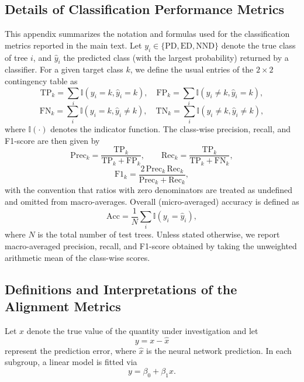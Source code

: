 {\clearpage
\subsection{Details of Classification Performance Metrics}
\label{appendix::classification-performance}
This appendix summarizes the notation and formulas used for the classification metrics reported in the main text. Let \(y_i \in \{\mathrm{PD},\mathrm{ED},\mathrm{NND}\}\) denote the true class of tree \(i\), and \(\widehat{y}_i\) the predicted class (with the largest probability) returned by a classifier. For a given target class \(k\), we define the usual entries of the \(2\times 2\) contingency table as
\begin{equation}
\mathrm{TP}_k = \sum_i \mathbb{I}(y_i = k, \widehat{y}_i = k), \quad
\mathrm{FP}_k = \sum_i \mathbb{I}(y_i \neq k, \widehat{y}_i = k),
\end{equation}
\begin{equation}
\mathrm{FN}_k = \sum_i \mathbb{I}(y_i = k, \widehat{y}_i \neq k), \quad
\mathrm{TN}_k = \sum_i \mathbb{I}(y_i \neq k, \widehat{y}_i \neq k),
\end{equation}
where \(\mathbb{I}(\cdot)\) denotes the indicator function. The class-wise precision, recall, and F1-score are then given by
\begin{equation}
\mathrm{Prec}_k = \frac{\mathrm{TP}_k}{\mathrm{TP}_k + \mathrm{FP}_k}, \qquad
\mathrm{Rec}_k  = \frac{\mathrm{TP}_k}{\mathrm{TP}_k + \mathrm{FN}_k},
\end{equation}
\begin{equation}
\mathrm{F1}_k = \frac{2\,\mathrm{Prec}_k\,\mathrm{Rec}_k}{\mathrm{Prec}_k + \mathrm{Rec}_k},
\end{equation}
with the convention that ratios with zero denominators are treated as undefined and omitted from macro-averages. Overall (micro-averaged) accuracy is defined as
\begin{equation}
\mathrm{Acc} = \frac{1}{N} \sum_i \mathbb{I}(y_i = \widehat{y}_i),
\end{equation}
where \(N\) is the total number of test trees. Unless stated otherwise, we report macro-averaged precision, recall, and F1-score obtained by taking the unweighted arithmetic mean of the class-wise scores.

\clearpage
\subsection{Definitions and Interpretations of the Alignment Metrics}
\label{appendix::alignment-metrics}
Let $x$ denote the true value of the quantity under investigation and let 
\begin{equation}
y = x - \widehat{x}
\end{equation}
represent the prediction error, where $\widehat{x}$ is the neural network prediction. In each subgroup, a linear model is fitted via 
\begin{equation}
y = \beta_0 + \beta_1 x.
\end{equation}

}
